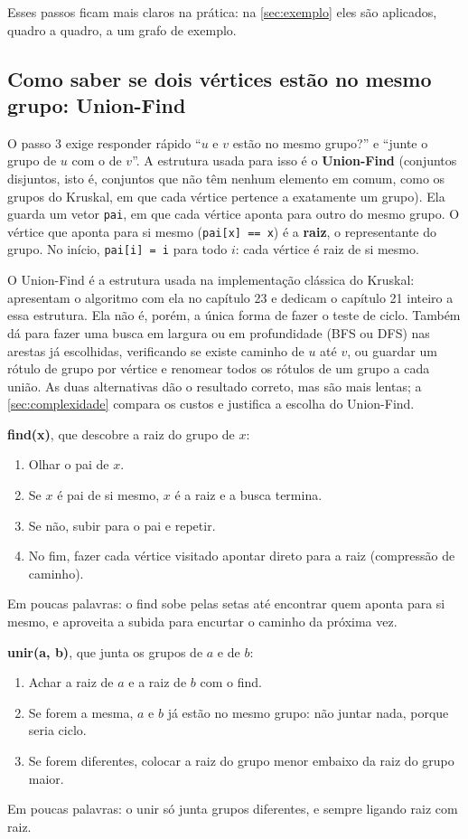 \documentclass[a4paper]{article}
\begin{document}
Esses passos ficam mais claros na prática: na \cref{sec:exemplo} eles são
aplicados, quadro a quadro, a um grafo de exemplo.

\subsection{Como saber se dois vértices estão no mesmo grupo: Union-Find}

O passo 3 exige responder rápido ``$u$ e $v$ estão no mesmo grupo?'' e ``junte o
grupo de $u$ com o de $v$''. A estrutura usada para isso é o
\textbf{Union-Find} (conjuntos disjuntos, isto é, conjuntos que não têm nenhum
elemento em comum, como os grupos do Kruskal, em que cada vértice pertence a
exatamente um grupo). Ela guarda um vetor \texttt{pai}, em que cada vértice
aponta para outro do mesmo grupo. O vértice que aponta para si mesmo
(\texttt{pai[x] == x}) é a \textbf{raiz}, o representante do grupo. No início,
\texttt{pai[i] = i} para todo $i$: cada vértice é raiz de si mesmo.

O Union-Find é a estrutura usada na implementação clássica do Kruskal:
\textcite{cormen2012} apresentam o algoritmo com ela no capítulo 23 e dedicam o
capítulo 21 inteiro a essa estrutura. Ela não é, porém, a única forma de fazer o
teste de ciclo. Também dá para fazer uma busca em largura ou em profundidade (BFS
ou DFS) nas arestas já escolhidas, verificando se existe caminho de $u$ até $v$,
ou guardar um rótulo de grupo por vértice e renomear todos os rótulos de um grupo
a cada união. As duas alternativas dão o resultado correto, mas são mais lentas;
a \cref{sec:complexidade} compara os custos e justifica a escolha do Union-Find.

\textbf{find(x)}, que descobre a raiz do grupo de $x$:
\begin{enumerate}
    \item Olhar o pai de $x$.
    \item Se $x$ é pai de si mesmo, $x$ é a raiz e a busca termina.
    \item Se não, subir para o pai e repetir.
    \item No fim, fazer cada vértice visitado apontar direto para a raiz (compressão de caminho).
\end{enumerate}
Em poucas palavras: o find sobe pelas setas até encontrar quem aponta para si
mesmo, e aproveita a subida para encurtar o caminho da próxima vez.

\textbf{unir(a, b)}, que junta os grupos de $a$ e de $b$:
\begin{enumerate}
    \item Achar a raiz de $a$ e a raiz de $b$ com o find.
    \item Se forem a mesma, $a$ e $b$ já estão no mesmo grupo: não juntar nada, porque seria ciclo.
    \item Se forem diferentes, colocar a raiz do grupo menor embaixo da raiz do grupo maior.
\end{enumerate}
Em poucas palavras: o unir só junta grupos diferentes, e sempre ligando raiz com raiz.
\end{document}

